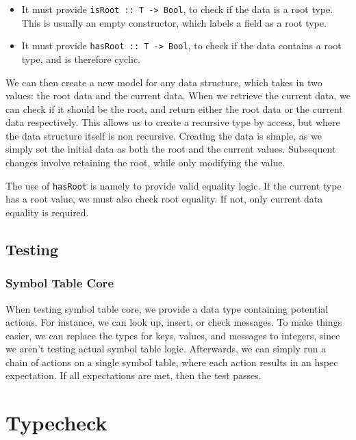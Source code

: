 \documentclass[11pt]{article}
\begin{document}
\begin{itemize}
	\item It must provide \texttt{isRoot :: T -> Bool}, to check if the data is a root type. This is usually an empty constructor, which labels a field as a root type.
	\item It must provide \texttt{hasRoot :: T -> Bool}, to check if the data contains a root type, and is therefore cyclic.
\end{itemize}

We can then create a new model for any data structure, which takes in two values: the root data and the current data.
When we retrieve the current data, we can check if it should be the root, and return either the root data or the current data respectively.
This allows us to create a recursive type by access, but where the data structure itself is non recursive.
Creating the data is simple, as we simply set the initial data as both the root and the current values.
Subsequent changes involve retaining the root, while only modifying the value.

The use of \texttt{hasRoot} is namely to provide valid equality logic.
If the current type has a root value, we must also check root equality.
If not, only current data equality is required.

\subsection{Testing} %

\subsubsection{Symbol Table Core}
\label{sec:test-symbol-table-core}

When testing symbol table core, we provide a data type containing potential actions. For instance, we can look up, insert, or check messages.
To make things easier, we can replace the types for keys, values, and messages to integers, since we aren't testing actual symbol table logic.
Afterwards, we can simply run a chain of actions on a single symbol table, where each action results in an hspec expectation.
If all expectations are met, then the test passes.

\section{Typecheck}
\end{document}
